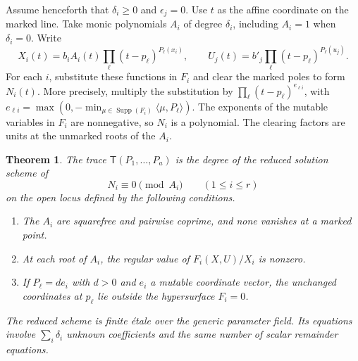 \documentclass[11pt,reqno]{amsart}
\numberwithin{equation}{section}
\newtheorem{theorem}{Theorem}[section]
\theoremstyle{definition}
\theoremstyle{remark}
\DeclareMathOperator{\Supp}{Supp}
\begin{document}
Assume henceforth that \(\delta_i\ge0\) and \(\epsilon_j=0\).
Use \(t\) as the affine coordinate on the marked line.
Take monic polynomials \(A_i\) of degree \(\delta_i\), including
\(A_i=1\) when \(\delta_i=0\). Write
\[ X_i(t)=b_iA_i(t)\prod_\ell(t-p_\ell)^{P_\ell(x_i)},\qquad U_j(t)=b'_j\prod_\ell(t-p_\ell)^{P_\ell(u_j)}. \]
For each \(i\), substitute these functions in \(F_i\) and clear
the marked poles to form \(N_i(t)\). More precisely, multiply the
substitution by \(\prod_\ell(t-p_\ell)^{e_{\ell i}}\), with
\(e_{\ell i}=\max(0,-\min_{\mu\in\Supp(F_i)}\langle\mu,P_\ell\rangle)\).
The exponents of the mutable variables in \(F_i\) are nonnegative,
so \(N_i\) is a polynomial. The clearing factors are units at the
unmarked roots of the \(A_i\).

\begin{theorem}\label{thm:incidence}
The trace \(\mathsf T(P_1,\ldots,P_a)\) is the degree of the reduced
solution scheme of
\begin{equation}\label{eq:trace-congruences}
N_i\equiv0\pmod{A_i}\qquad(1\le i\le r)
\end{equation}
on the open locus defined by the following conditions.
\begin{enumerate}
\item The \(A_i\) are squarefree and pairwise coprime, and none
 vanishes at a marked point.
\item At each root of \(A_i\), the regular value of
      \(F_i(X,U)/X_i\) is nonzero.
\item If \(P_\ell=d e_i\) with \(d>0\) and \(e_i\) a mutable
 coordinate vector, the unchanged coordinates at \(p_\ell\)
 lie outside the hypersurface \(F_i=0\).
\end{enumerate}
The reduced scheme is finite \'{e}tale over the generic parameter
field. Its equations involve \(\sum_i\delta_i\) unknown coefficients
and the same number of scalar remainder equations.
\end{theorem}
\end{document}
